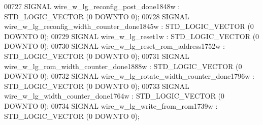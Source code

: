 \begin{DoxyCode}
{00727      \textcolor{keywordflow}{SIGNAL}  \textcolor{vhdlchar}{wire_w_lg_reconfig_post_done1848w}  \textcolor{vhdlchar}{:}   \textcolor{comment}{STD\_LOGIC\_VECTOR} \textcolor{vhdlchar}{(}\textcolor{vhdllogic}{}\textcolor{vhdllogic}{0} \textcolor{keywordflow}{DOWNTO} \textcolor{vhdllogic}{}\textcolor{vhdllogic}{0}\textcolor{vhdlchar}{)};
00728      \textcolor{keywordflow}{SIGNAL}  \textcolor{vhdlchar}{wire_w_lg_reconfig_width_counter_done1845w} \textcolor{vhdlchar}{:}   \textcolor{comment}{STD\_LOGIC\_VECTOR} \textcolor{vhdlchar}{(}\textcolor{vhdllogic}{}\textcolor{vhdllogic}{0} \textcolor{keywordflow}{DOWNTO} \textcolor{vhdllogic}{}\textcolor{vhdllogic}{0}\textcolor{vhdlchar}{)};
00729      \textcolor{keywordflow}{SIGNAL}  \textcolor{vhdlchar}{wire_w_lg_reset1w}  \textcolor{vhdlchar}{:}   \textcolor{comment}{STD\_LOGIC\_VECTOR} \textcolor{vhdlchar}{(}\textcolor{vhdllogic}{}\textcolor{vhdllogic}{0} \textcolor{keywordflow}{DOWNTO} \textcolor{vhdllogic}{}\textcolor{vhdllogic}{0}\textcolor{vhdlchar}{)};
00730      \textcolor{keywordflow}{SIGNAL}  \textcolor{vhdlchar}{wire_w_lg_reset_rom_address1752w}   \textcolor{vhdlchar}{:}   \textcolor{comment}{STD\_LOGIC\_VECTOR} \textcolor{vhdlchar}{(}\textcolor{vhdllogic}{}\textcolor{vhdllogic}{0} \textcolor{keywordflow}{DOWNTO} \textcolor{vhdllogic}{}\textcolor{vhdllogic}{0}\textcolor{vhdlchar}{)};
00731      \textcolor{keywordflow}{SIGNAL}  \textcolor{vhdlchar}{wire_w_lg_rom_width_counter_done1888w}  \textcolor{vhdlchar}{:}   \textcolor{comment}{STD\_LOGIC\_VECTOR} \textcolor{vhdlchar}{(}\textcolor{vhdllogic}{}\textcolor{vhdllogic}{0} \textcolor{keywordflow}{DOWNTO} \textcolor{vhdllogic}{}\textcolor{vhdllogic}{0}\textcolor{vhdlchar}{)};
00732      \textcolor{keywordflow}{SIGNAL}  \textcolor{vhdlchar}{wire_w_lg_rotate_width_counter_done1796w}   \textcolor{vhdlchar}{:}   \textcolor{comment}{STD\_LOGIC\_VECTOR} \textcolor{vhdlchar}{(}\textcolor{vhdllogic}{}\textcolor{vhdllogic}{0} \textcolor{keywordflow}{DOWNTO} \textcolor{vhdllogic}{}\textcolor{vhdllogic}{0}\textcolor{vhdlchar}{)};
00733      \textcolor{keywordflow}{SIGNAL}  \textcolor{vhdlchar}{wire_w_lg_width_counter_done1764w}  \textcolor{vhdlchar}{:}   \textcolor{comment}{STD\_LOGIC\_VECTOR} \textcolor{vhdlchar}{(}\textcolor{vhdllogic}{}\textcolor{vhdllogic}{0} \textcolor{keywordflow}{DOWNTO} \textcolor{vhdllogic}{}\textcolor{vhdllogic}{0}\textcolor{vhdlchar}{)};
00734      \textcolor{keywordflow}{SIGNAL}  \textcolor{vhdlchar}{wire_w_lg_write_from_rom1739w}  \textcolor{vhdlchar}{:}   \textcolor{comment}{STD\_LOGIC\_VECTOR} \textcolor{vhdlchar}{(}\textcolor{vhdllogic}{}\textcolor{vhdllogic}{0} \textcolor{keywordflow}{DOWNTO} \textcolor{vhdllogic}{}\textcolor{vhdllogic}{0}\textcolor{vhdlchar}{)};
}
\end{DoxyCode}
